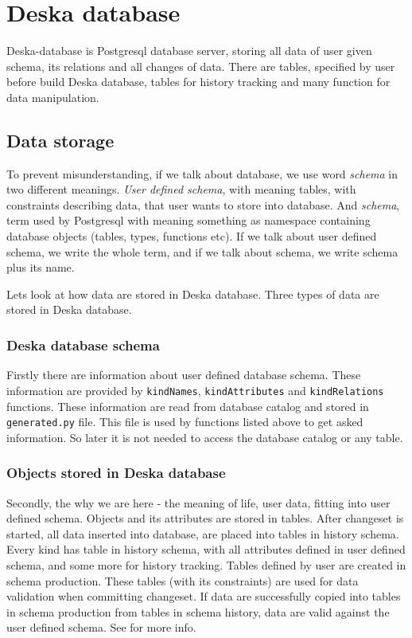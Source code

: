 \documentclass[deska]{subfiles}
\begin{document}

\section{Deska database}
Deska-database is Postgresql database server, storing all data of user given schema, its relations and all changes of data.
There are tables, specified by user before build Deska database, tables for history tracking and many function for data manipulation.

\subsection{Data storage}
To prevent misunderstanding, if we talk about database, we use word {\em schema} in two different meanings. {\em User defined schema},
with meaning tables, with constraints describing data, that user wants to store into database. And {\em schema}, term used by
Postgresql with meaning something as namespace containing database objects (tables, types, functions etc).
If we talk about user defined schema, we write the whole term, and if we talk about schema, we write
schema plus its name.

Lets look at how data are stored in Deska database. Three types of data are stored in Deska database.

\subsubsection{Deska database schema} 
Firstly there are information about user defined database schema. These information are provided by {\tt kindNames}, {\tt kindAttributes} and {\tt kindRelations} functions.
These information are read from database catalog and stored in {\tt generated.py} file. This file is used by functions listed above to get asked information. So later it is not needed to access the database catalog or any table.

\subsubsection{Objects stored in Deska database}
Secondly, the why we are here - the meaning of life, user data, fitting into user defined schema.
Objects and its attributes are stored in tables. 
After changeset is started, all data inserted into database, are placed into tables in history schema. Every kind has table in history
schema, with all attributes defined in user defined schema, and some more for history tracking.
Tables defined by user are created in schema production. These tables
(with its constraints) are used for data validation when committing changeset. If data are successfully copied into tables in schema production
from tables in schema history, data are valid against the user defined schema.
See  for more info.
\end{document}
